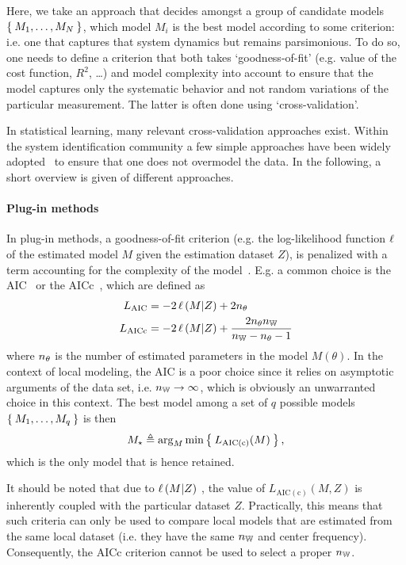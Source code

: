 Here, we take an approach that decides amongst a group of candidate models $\Set{M_1, \ldots, M_N}$, which model $M_i$ is the best model according to some criterion: i.e. one that captures that system dynamics but remains parsimonious.
To do so, one needs to define a criterion that both takes `goodness-of-fit' (e.g. value of the cost function, $R^2$, \ldots) and model complexity into account to ensure that the model captures only the systematic behavior and not random variations of the particular measurement.
The latter is often done using `cross-validation'.

In statistical learning, many relevant cross-validation approaches exist.
Within the system identification community a few simple approaches have been widely adopted~\citep[Chapter 11]{Pintelon2012} to ensure that one does not overmodel the data.
In the following, a short overview is given of different approaches.

\paragraph{Plug-in methods}
In plug-in methods, a goodness-of-fit criterion (e.g. the log-likelihood function $\operatorname{\ell}$ of the estimated model $M$ given the estimation dataset $Z$), is penalized with a term accounting for the complexity of the model~\citep{Burnham2002}.
E.g. a common choice is the \gls{AIC}~\citep{Akaike1974} or the \gls{AICc}~\citep{Hurvich1989}, which are defined as
\begin{align}
L_{\mathrm{\mathrm{AIC}}} &=
 - 2  \operatorname{\ell}\left( M | Z \right)  
 + 2 n_{\theta}\\
L_{\mathrm{\mathrm{AICc}}} &= 
- 2  \operatorname{\ell}\left( M | Z \right)  
+   \frac{2 n_{\theta}n_{\mathbb{W}}}{n_{\mathbb{W}} - n_{\theta} - 1}
\end{align}
where $n_{\theta}$ is the number of  estimated parameters in the model $M(\theta)$.
In the context of local modeling, the \gls{AIC} is a poor choice since it relies on asymptotic arguments of the data set, i.e. $n_{\mathbb{W}} \to \infty$, which is obviously an unwarranted choice in this context.
The best model among a set of $q$ possible models $\Set{M_1, \ldots, M_q}$ is then
\begin{equation}
  M_{\star} \triangleq 
  \arg_{M} \min 
  \Set{
    L_{\mathrm{AIC(c)}}(M)
  }
  \text{,}
\end{equation}
which is the only model that is hence retained.

\begin{remark}
It should be noted that due to $\operatorname{\ell}\left( M | Z \right) $ , the value of $L_{\mathrm{AIC(c)}}(M,Z)$ is inherently coupled with the particular dataset $Z$.
Practically, this means that such criteria can only be used to compare local models that are estimated from the same local dataset (i.e. they have the same $n_{\mathbb{W}}$ and center frequency).
Consequently, the \gls{AICc} criterion cannot be used to select a proper $n_{\mathbb{W}}$.
\end{remark}


